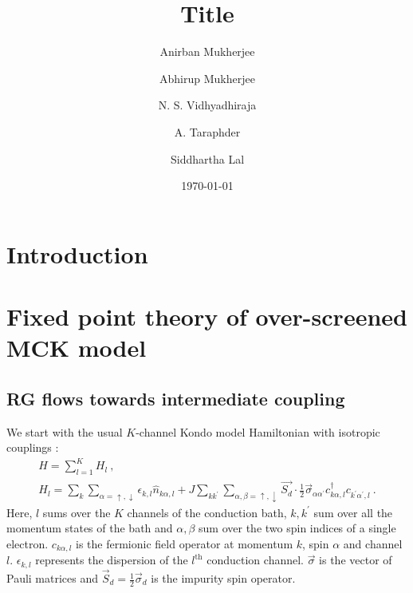 \documentclass[reprint,prb,superscriptaddress]{revtex4-2}
\begin{document}
\title{Title}
\author{Anirban Mukherjee}
\author{Abhirup Mukherjee}
\author{N. S. Vidhyadhiraja}
\author{A. Taraphder}
\author{Siddhartha Lal}
\date{\today}
\begin{abstract}
	\lipsum[1-2]
\end{abstract}
\maketitle
\section{Introduction}


\section{Fixed point theory of over-screened MCK model}

\subsection{RG flows towards intermediate coupling}
\label{rg_flow_section}
We start with the usual \(K\)-channel Kondo model Hamiltonian with isotropic couplings \cite{Noz_blandin_1980}:
\begin{gather}
	\label{mc_ham}
	H = \sum_{l=1}^K H_l~,\nonumber\\
	H_l = \sum_{k}\sum_{\alpha=\uparrow,\downarrow}\epsilon_{k,l} \hat n_{k\alpha,l} + J\sum_{kk^\prime} \sum_{\alpha,\beta= \uparrow,\downarrow}\vec{S_d}\cdot\frac{1}{2}\vec{\sigma}_{\alpha\alpha^\prime}c_{k\alpha,l}^\dagger c_{k^\prime\alpha^\prime, l}~.
\end{gather}
Here, \(l\) sums over the \(K\) channels of the conduction bath, \(k,k^\prime\) sum over all the momentum states of the bath and \(\alpha,\beta\) sum over the two spin indices of a single electron. \(c_{k\alpha,l}\) is the fermionic field operator at momentum \(k\), spin \(\alpha\) and channel \(l\). \(\epsilon_{k,l}\) represents the dispersion of the \(l^\text{th}\) conduction channel. \(\vec \sigma\) is the vector of Pauli matrices and \(\vec S_d = \frac{1}{2}\vec \sigma_d\) is the impurity spin operator.
\end{document}
